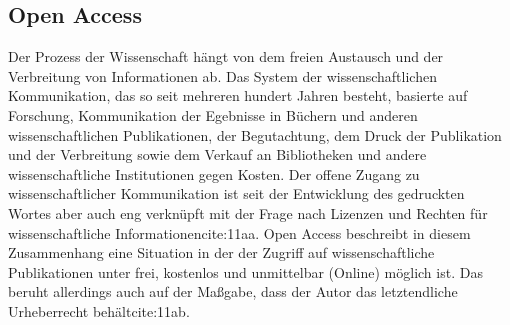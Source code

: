 \subsection{Open Access} 
Der Prozess der Wissenschaft hängt von dem freien Austausch und der Verbreitung von Informationen ab\cite{cite:11}. Das System der wissenschaftlichen Kommunikation, das so seit mehreren hundert Jahren besteht, basierte auf Forschung, Kommunikation der Egebnisse in Büchern und anderen wissenschaftlichen Publikationen, der Begutachtung, dem Druck der Publikation und der Verbreitung sowie dem Verkauf an Bibliotheken und andere wissenschaftliche Institutionen gegen Kosten\cite{cite:11a}. Der offene Zugang zu wissenschaftlicher Kommunikation ist seit der Entwicklung des gedruckten Wortes aber auch eng verknüpft mit der Frage nach Lizenzen und Rechten für wissenschaftliche Informationen{cite:11aa}. Open Access beschreibt in diesem Zusammenhang eine Situation in der der Zugriff auf wissenschaftliche Publikationen unter frei, kostenlos und unmittelbar (Online) möglich ist. Das beruht allerdings auch auf der Maßgabe, dass der Autor das letztendliche Urheberrecht behält{cite:11ab}.


